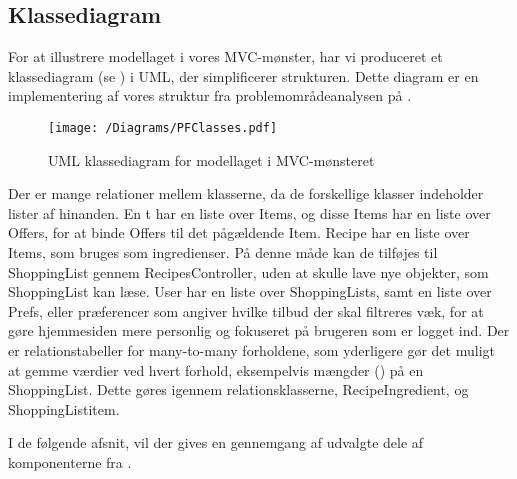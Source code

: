 \subsection{Klassediagram}
For at illustrere modellaget i vores MVC-mønster, har vi produceret et klassediagram (se ) i UML, der simplificerer strukturen. 
Dette diagram er en implementering af vores struktur fra problemområdeanalysen på .

\begin{figure}[h]
\centering
 \texttt{[image: /Diagrams/PFClasses.pdf]}
\caption{UML klassediagram for modellaget i MVC-mønsteret}\label{diagram:klassediagram}
\end{figure}

Der er mange relationer mellem klasserne, da de forskellige klasser indeholder lister af hinanden.
En t har en liste over Items, og disse Items har en liste over Offers, for at binde Offers til det pågældende Item.
Recipe har en liste over Items, som bruges som ingredienser.
På denne måde kan de tilføjes til ShoppingList gennem RecipesController, uden at skulle lave nye objekter, som ShoppingList kan læse.
User har en liste over ShoppingLists, samt en liste over Prefs, eller præferencer som angiver hvilke tilbud der skal filtreres væk, for at gøre hjemmesiden mere personlig og fokuseret på brugeren som er logget ind.
Der er relationstabeller for many-to-many forholdene, som yderligere gør det muligt at gemme værdier ved hvert forhold, eksempelvis mængder () på en ShoppingList.
Dette gøres igennem relationsklasserne, Recipe\textunderscore Ingredient, og ShoppingList\textunderscore item.

I de følgende afsnit, vil der gives en gennemgang af udvalgte dele af komponenterne fra .
